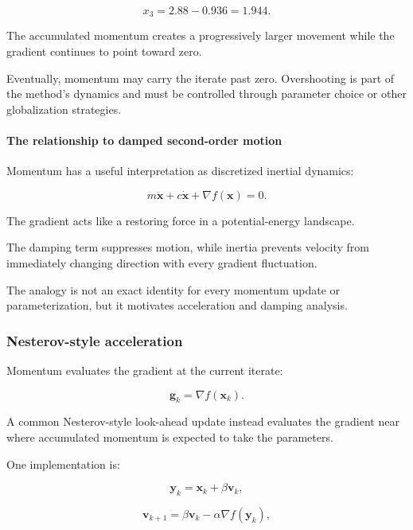 \[
x_3=2.88-0.936=1.944.
\]

The accumulated momentum creates a progressively larger movement while the gradient continues to point toward zero.

Eventually, momentum may carry the iterate past zero. Overshooting is part of the method's dynamics and must be controlled through parameter choice or other globalization strategies.

\paragraph{The relationship to damped second-order motion}\label{02-foundations-ii-ch026-the-relationship-to-damped-second-order-motion}

\hypertarget{02-foundations-ii-ch026-the-relationship-to-damped-second-order-motion}{}

Momentum has a useful interpretation as discretized inertial dynamics:

\[
m\ddot{\mathbf x} +c\dot{\mathbf x} +\nabla f(\mathbf x)=0.
\]

The gradient acts like a restoring force in a potential-energy landscape.

The damping term suppresses motion, while inertia prevents velocity from immediately changing direction with every gradient fluctuation.

The analogy is not an exact identity for every momentum update or parameterization, but it motivates acceleration and damping analysis.

\subsubsection{Nesterov-style acceleration}\label{02-foundations-ii-ch026-nesterov-style-acceleration}

\hypertarget{02-foundations-ii-ch026-nesterov-style-acceleration}{}

Momentum evaluates the gradient at the current iterate:

\[
\mathbf g_k=\nabla f(\mathbf x_k).
\]

A common Nesterov-style look-ahead update instead evaluates the gradient near where accumulated momentum is expected to take the parameters.

One implementation is:

\[
\mathbf y_k=\mathbf x_k+\beta\mathbf v_k,
\]

\[
\mathbf v_{k+1} = \beta\mathbf v_k-\alpha\nabla f(\mathbf y_k),
\]

